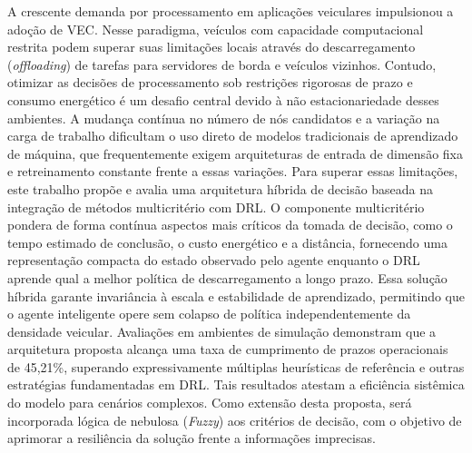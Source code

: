 A crescente demanda por processamento em aplicações veiculares impulsionou a adoção de \gls{VEC}. Nesse paradigma, veículos com capacidade computacional restrita podem superar suas limitações locais através do descarregamento (\textit{offloading}) de tarefas para servidores de borda e veículos vizinhos. Contudo, otimizar as decisões de processamento sob restrições rigorosas de prazo e consumo energético é um desafio central devido à não estacionariedade desses ambientes. A mudança contínua no número de nós candidatos e a variação na carga de trabalho dificultam o uso direto de modelos tradicionais de aprendizado de máquina, que frequentemente exigem arquiteturas de entrada de dimensão fixa e retreinamento constante frente a essas variações. Para superar essas limitações, este trabalho propõe e avalia uma arquitetura híbrida de decisão baseada na integração de métodos multicritério com \gls{DRL}. O componente multicritério pondera de forma contínua aspectos mais críticos da tomada de decisão, como o tempo estimado de conclusão, o custo energético e a distância, fornecendo uma representação compacta do estado observado pelo agente enquanto o \gls{DRL} aprende qual a melhor política de descarregamento a longo prazo. Essa solução híbrida garante invariância à escala e estabilidade de aprendizado, permitindo que o agente inteligente opere sem colapso de política independentemente da densidade veicular. Avaliações em ambientes de simulação demonstram que a arquitetura proposta alcança uma taxa de cumprimento de prazos operacionais de 45,21\%, superando expressivamente múltiplas heurísticas de referência e outras estratégias fundamentadas em \gls{DRL}. Tais resultados atestam a eficiência sistêmica do modelo para cenários complexos. Como extensão desta proposta, será incorporada lógica de nebulosa (\textit{Fuzzy}) aos critérios de decisão, com o objetivo de aprimorar a resiliência da solução frente a informações imprecisas.

